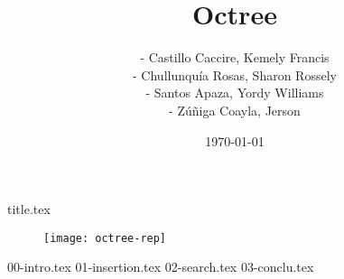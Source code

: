 \documentclass[a4paper,12pt]{article}
\title{Octree}
\author{- Castillo Caccire, Kemely Francis\\
        - Chullunquía Rosas, Sharon Rossely\\
        - Santos Apaza, Yordy Williams\\
        - Zúñiga Coayla, Jerson}
\date{\today}
\begin{document}
{title.tex}

\tableofcontents
\begin{figure}[H]
  \centering
  \texttt{[image: octree-rep]}
\end{figure}
\newpage

{00-intro.tex}
{01-insertion.tex}
{02-search.tex}
{03-conclu.tex}

\printbibliography[heading=bibintoc]
\end{document}
